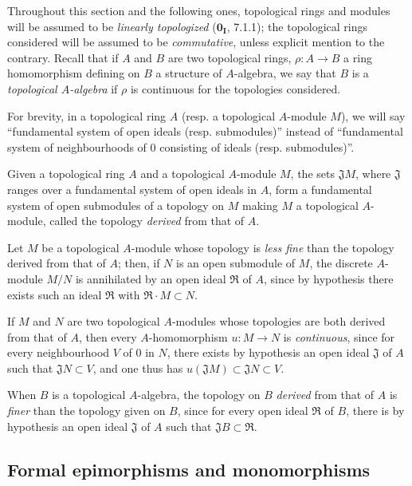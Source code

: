 \begin{env}[19.0.3]
\label{0.19.0.3}
Throughout this section and the following ones, topological rings and modules will be assumed to be \emph{linearly topologized} ($\mathbf{0_I}$, 7.1.1);
the topological rings considered will be assumed to be \emph{commutative}, unless explicit mention to the contrary.
Recall that if $A$ and $B$ are two topological rings, $\rho:A\to B$ a ring homomorphism defining on $B$ a structure of $A$-algebra, we say that $B$ is a \emph{topological $A$-algebra} if $\rho$ is continuous for the topologies considered.

For brevity, in a topological ring $A$ (resp. a topological $A$-module $M$), we will say ``fundamental system of open ideals (resp. submodules)'' instead of ``fundamental system of neighbourhoods of $0$ consisting of ideals (resp. submodules)''.

Given a topological ring $A$ and a topological $A$-module $M$, the sets $\mathfrak{J}M$, where $\mathfrak{J}$ ranges over a fundamental system of open ideals in $A$, form a fundamental system of open submodules of a topology on $M$ making $M$ a topological $A$-module, called the topology \emph{derived} from that of $A$.

Let $M$ be a topological $A$-module whose topology is \emph{less fine} than the topology derived from that of $A$;
then, if $N$ is an open submodule of $M$, the discrete $A$-module $M/N$ is annihilated by an open ideal $\mathfrak{R}$ of $A$, since by hypothesis there exists such an ideal $\mathfrak{R}$ with $\mathfrak{R}\cdot M\subset N$.


If $M$ and $N$ are two topological $A$-modules whose topologies are both derived from that of $A$, then every $A$-homomorphism $u:M\to N$ is \emph{continuous}, since for every neighbourhood $V$ of $0$ in $N$, there exists by hypothesis an open ideal $\mathfrak{J}$ of $A$ such that $\mathfrak{J}N\subset V$, and one thus has $u(\mathfrak{J}M)\subset\mathfrak{J}N\subset V$.

When $B$ is a topological $A$-algebra, the topology on $B$ \emph{derived} from that of $A$ is \emph{finer} than the topology given on $B$, since for every open ideal $\mathfrak{R}$ of $B$, there is by hypothesis an open ideal $\mathfrak{J}$ of $A$ such that $\mathfrak{J}B\subset\mathfrak{R}$.
\end{env}

\subsection{Formal epimorphisms and monomorphisms}
\label{subsection:0.19.1}

